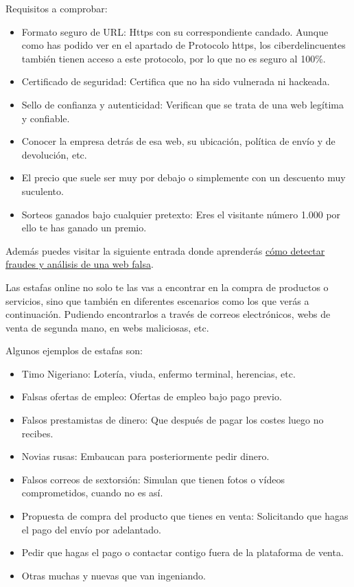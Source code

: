 \documentclass[
  spanish,
  a4paper,
  openany]{book}
\begin{document}
Requisitos a comprobar:

\begin{itemize}
\item
  Formato seguro de URL: Https con su correspondiente candado. Aunque como has podido ver en el apartado de Protocolo https, los ciberdelincuentes también tienen acceso a este protocolo, por lo que no es seguro al 100\%.
\item
  Certificado de seguridad: Certifica que no ha sido vulnerada ni hackeada.
\item
  Sello de confianza y autenticidad: Verifican que se trata de una web legítima y confiable.
\item
  Conocer la empresa detrás de esa web, su ubicación, política de envío y de devolución, etc.
\item
  El precio que suele ser muy por debajo o simplemente con un descuento muy suculento.
\item
  Sorteos ganados bajo cualquier pretexto: Eres el visitante número 1.000 por ello te has ganado un premio.
\end{itemize}

Además puedes visitar la siguiente entrada donde aprenderás \href{https://www.osi.es/es/actualidad/blog/2018/08/08/detectando-fraudes-analisis-de-una-web-de-venta-falsa}{cómo detectar fraudes y análisis de una web falsa}.

Las estafas online no solo te las vas a encontrar en la compra de productos o servicios, sino que también en diferentes escenarios como los que verás a continuación. Pudiendo encontrarlos a través de correos electrónicos, webs de venta de segunda mano, en webs maliciosas, etc.

Algunos ejemplos de estafas son:

\begin{itemize}
\item
  Timo Nigeriano: Lotería, viuda, enfermo terminal, herencias, etc.
\item
  Falsas ofertas de empleo: Ofertas de empleo bajo pago previo.
\item
  Falsos prestamistas de dinero: Que después de pagar los costes luego no recibes.
\item
  Novias rusas: Embaucan para posteriormente pedir dinero.
\item
  Falsos correos de sextorsión: Simulan que tienen fotos o vídeos comprometidos, cuando no es así.
\item
  Propuesta de compra del producto que tienes en venta: Solicitando que hagas el pago del envío por adelantado.
\item
  Pedir que hagas el pago o contactar contigo fuera de la plataforma de venta.
\item
  Otras muchas y nuevas que van ingeniando.
\end{itemize}
\end{document}
